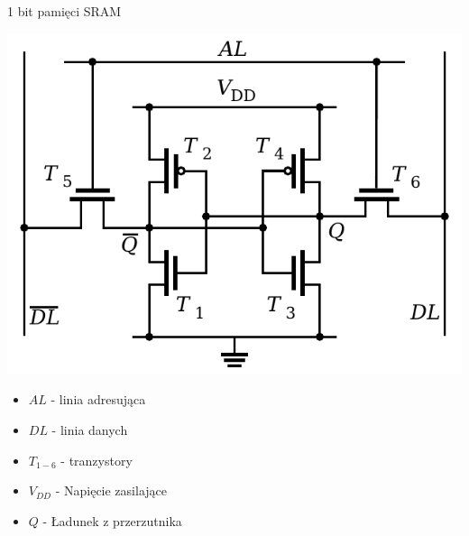 \documentclass{beamer}
\begin{document}
\begin{frame}{1 bit pamięci SRAM}
	  \begin{minipage}{0.6\textwidth}
    \includegraphics[scale=0.6]{assets/SRAM_bit.pdf}
  \end{minipage}%
  \begin{minipage}{0.4\textwidth}
  	\begin{itemize}
  		\item $AL$ - linia adresująca
  		\item $DL$ - linia danych
  		\item $T_{1-6}$ - tranzystory
  		\item $V_{DD}$ - Napięcie zasilające
  		\item $Q$ - Ładunek z przerzutnika
  	\end{itemize}
  \end{minipage}
\end{frame}
\end{document}
